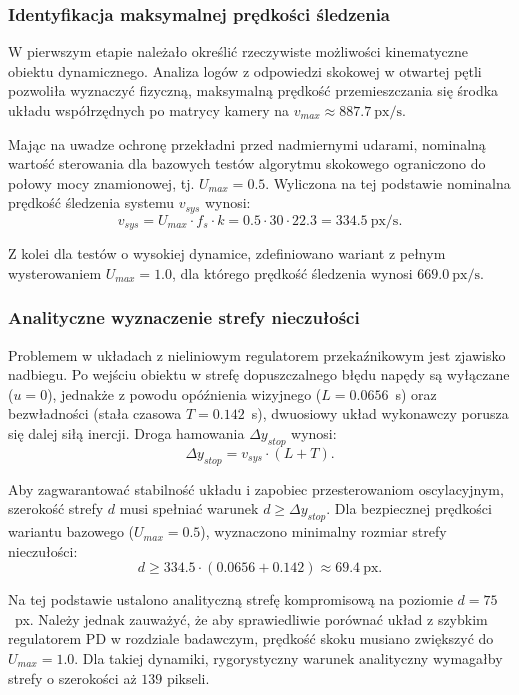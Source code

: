 \documentclass[a4paper,twoside,12pt]{book}
\begin{document}
\subsubsection{Identyfikacja maksymalnej prędkości śledzenia}
W pierwszym etapie należało określić rzeczywiste możliwości kinematyczne obiektu dynamicznego. Analiza logów z odpowiedzi skokowej w otwartej pętli pozwoliła wyznaczyć fizyczną, maksymalną prędkość przemieszczania się środka układu współrzędnych po matrycy kamery na $v_{max} \approx 887.7~\text{px/s}$.

Mając na uwadze ochronę przekładni przed nadmiernymi udarami, nominalną wartość sterowania dla bazowych testów algorytmu skokowego ograniczono do połowy mocy znamionowej, tj. $U_{max} = 0.5$. Wyliczona na tej podstawie nominalna prędkość śledzenia systemu $v_{sys}$ wynosi:
\begin{equation}
v_{sys} = U_{max} \cdot f_{s} \cdot k = 0.5 \cdot 30 \cdot 22.3 = 334.5~\text{px/s}.
\end{equation}

Z kolei dla testów o wysokiej dynamice, zdefiniowano wariant z pełnym wysterowaniem $U_{max} = 1.0$, dla którego prędkość śledzenia wynosi $669.0~\text{px/s}$.

\subsubsection{Analityczne wyznaczenie strefy nieczułości}
\label{sec:bang_bang_deadband}
Problemem w układach z nieliniowym regulatorem przekaźnikowym jest zjawisko nadbiegu. Po wejściu obiektu w strefę dopuszczalnego błędu napędy są wyłączane ($u = 0$), jednakże z powodu opóźnienia wizyjnego ($L = 0.0656$~s) oraz bezwładności (stała czasowa $T = 0.142$~s), dwuosiowy układ wykonawczy porusza się dalej siłą inercji. Droga hamowania $\Delta y_{stop}$ wynosi:
\begin{equation}
\Delta y_{stop} = v_{sys} \cdot (L + T).
\end{equation}

Aby zagwarantować stabilność układu i zapobiec przesterowaniom oscylacyjnym, szerokość strefy $d$ musi spełniać warunek $d \ge \Delta y_{stop}$. Dla bezpiecznej prędkości wariantu bazowego ($U_{max} = 0.5$), wyznaczono minimalny rozmiar strefy nieczułości:
\begin{equation}
d \ge 334.5 \cdot (0.0656 + 0.142) \approx 69.4~\text{px}.
\end{equation}

Na tej podstawie ustalono analityczną strefę kompromisową na poziomie $d = 75$~px. Należy jednak zauważyć, że aby sprawiedliwie porównać układ z szybkim regulatorem PD w rozdziale badawczym, prędkość skoku musiano zwiększyć do $U_{max} = 1.0$. Dla takiej dynamiki, rygorystyczny warunek analityczny wymagałby strefy o szerokości aż $139$ pikseli. 
\end{document}
